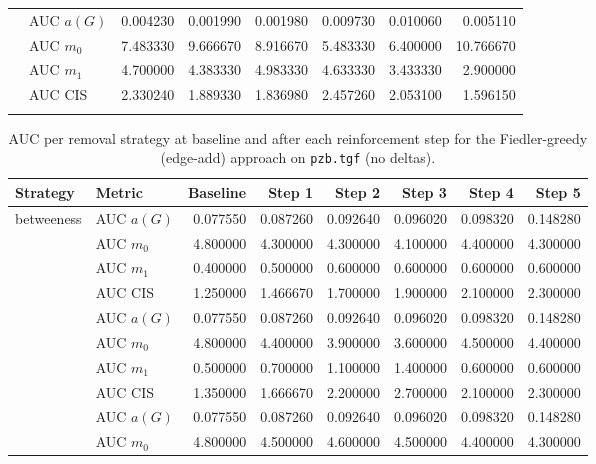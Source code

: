 \begin{table}[htbp]
\begin{tabular}{llrrrrrr}
    \addlinespace
    \multirow{4}{*}{random} & AUC $a(G)$ & 0.004230 & 0.001990 & 0.001980 & 0.009730 & 0.010060 & 0.005110 \\
    & AUC $m_0$ & 7.483330 & 9.666670 & 8.916670 & 5.483330 & 6.400000 & 10.766670 \\
    & AUC $m_1$ & 4.700000 & 4.383330 & 4.983330 & 4.633330 & 3.433330 & 2.900000 \\
    & AUC CIS & 2.330240 & 1.889330 & 1.836980 & 2.457260 & 2.053100 & 1.596150 \\
    \addlinespace
    \bottomrule
  \end{tabular}
\end{table}

\begin{table}[htbp]
  \centering
  \caption{AUC per removal strategy at baseline and after each reinforcement step for the Fiedler-greedy (edge-add) approach on \texttt{pzb.tgf} (no deltas).}
  \label{tab:pzb-fiedler_greedy-auc}
  \begin{tabular}{llrrrrrr}
    \toprule
    \textbf{Strategy} & \textbf{Metric} & \textbf{Baseline} & \textbf{Step 1} & \textbf{Step 2} & \textbf{Step 3} & \textbf{Step 4} & \textbf{Step 5} \\
    \midrule
    \multirow{4}{*}{betweeness} & AUC $a(G)$ & 0.077550 & 0.087260 & 0.092640 & 0.096020 & 0.098320 & 0.148280 \\
    & AUC $m_0$ & 4.800000 & 4.300000 & 4.300000 & 4.100000 & 4.400000 & 4.300000 \\
    & AUC $m_1$ & 0.400000 & 0.500000 & 0.600000 & 0.600000 & 0.600000 & 0.600000 \\
    & AUC CIS & 1.250000 & 1.466670 & 1.700000 & 1.900000 & 2.100000 & 2.300000 \\
    \addlinespace
    \multirow{4}{*}{closeness} & AUC $a(G)$ & 0.077550 & 0.087260 & 0.092640 & 0.096020 & 0.098320 & 0.148280 \\
    & AUC $m_0$ & 4.800000 & 4.400000 & 3.900000 & 3.600000 & 4.500000 & 4.400000 \\
    & AUC $m_1$ & 0.500000 & 0.700000 & 1.100000 & 1.400000 & 0.600000 & 0.600000 \\
    & AUC CIS & 1.350000 & 1.666670 & 2.200000 & 2.700000 & 2.100000 & 2.300000 \\
    \addlinespace
    \multirow{4}{*}{core influence} & AUC $a(G)$ & 0.077550 & 0.087260 & 0.092640 & 0.096020 & 0.098320 & 0.148280 \\
    & AUC $m_0$ & 4.800000 & 4.500000 & 4.600000 & 4.500000 & 4.400000 & 4.300000 \\

\end{tabular}
\end{table}
